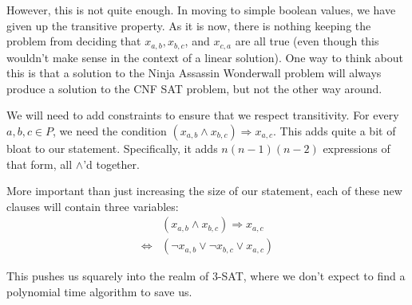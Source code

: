 \documentclass[12pt,x11names, rgb]{article}
\begin{document}
    However, this is not quite enough. In moving to simple boolean values, we have given up the transitive property. As it is now, there is nothing keeping the problem from deciding that $x_{a,b}, x_{b,c}$, and $x_{c,a}$ are all true (even though this wouldn't make sense in the context of a linear solution). One way to think about this is that a solution to the Ninja Assassin Wonderwall problem will always produce a solution to the CNF SAT problem, but not the other way around.

    We will need to add constraints to ensure that we respect transitivity. For every $a,b,c \in P$, we need the condition $(x_{a,b} \wedge x_{b,c}) \Rightarrow x_{a,c}$. This adds quite a bit of bloat to our statement. Specifically, it adds $n(n-1)(n-2)$ expressions of that form, all $\wedge$'d together.

    More important than just increasing the size of our statement, each of these new clauses will contain three variables:
    \begin{align*}
        &(x_{a,b} \wedge x_{b,c}) \Rightarrow x_{a,c} \\
        \Leftrightarrow & (\lnot x_{a,b} \vee \lnot x_{b,c} \vee x_{a,c})
    \end{align*}

    This pushes us squarely into the realm of 3-SAT, where we don't expect to find a polynomial time algorithm to save us. 
    
\end{document}
